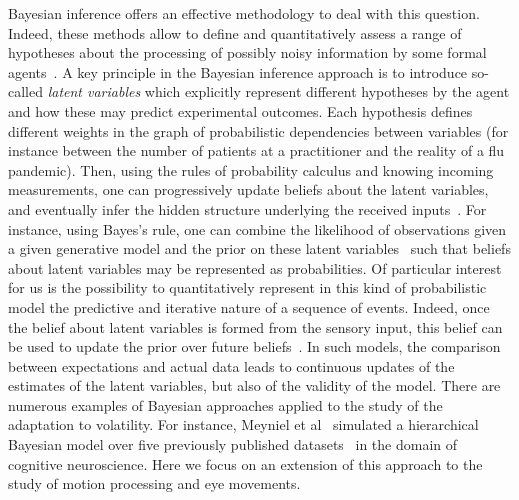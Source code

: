 \documentclass[10pt,letterpaper]{article}
\newcommand{\citep}[1]{\cite{#1}}
\newcommand{\citet}[1]{\cite{#1}}
\newcommand{\AM}[1]{\textbf{\textcolor{blue}{[AM: #1]}}}
\begin{document}
Bayesian inference offers an effective methodology
to deal with this question.
Indeed, these methods allow to define and quantitatively assess
a range of hypotheses about the processing of possibly noisy information by some formal agents~\citep{Deneve1999, Diaconescu2014, Daunizeau10a}.
A key principle in the Bayesian inference approach is
to introduce so-called \emph{latent variables}
which explicitly represent different hypotheses by the agent and how these may predict experimental outcomes.
Each hypothesis defines different weights in the graph of probabilistic dependencies between variables
(for instance between the number of patients at a practitioner and the reality of a flu pandemic).
Then, using the rules of probability calculus and knowing incoming measurements,
one can progressively update beliefs about the latent variables,
and eventually infer the hidden structure underlying the received inputs~\citep{Hoyer2003, Ma2014}.
For instance, using Bayes's rule, one can combine
the likelihood of observations given a given generative model and
the prior on these latent variables~\citep{Jaynes2014}
such that beliefs about latent variables
may be represented as probabilities.
Of particular interest for us is the possibility to
quantitatively represent in this kind of probabilistic model
the predictive and iterative nature of a sequence of events.
Indeed, once the belief about latent variables
is formed from the sensory input,
this belief can be used to update
the prior over future beliefs~\citep{Montagnini2007}.
In such models, the comparison between expectations and actual data leads to
continuous updates of the estimates of the latent variables,
but also of the validity of the model.
There are numerous examples of Bayesian approaches
applied to the study of the adaptation to volatility.
For instance, Meyniel et al~\citet{Meyniel16} simulated a hierarchical Bayesian model
over five previously published datasets~\citep{Squires1976, Huettel2002, Kolossa2013, Cho2002, Falk1997}
in the domain of cognitive neuroscience.
Here we focus on an extension of this approach to the study of motion processing and eye movements.
\end{document}
